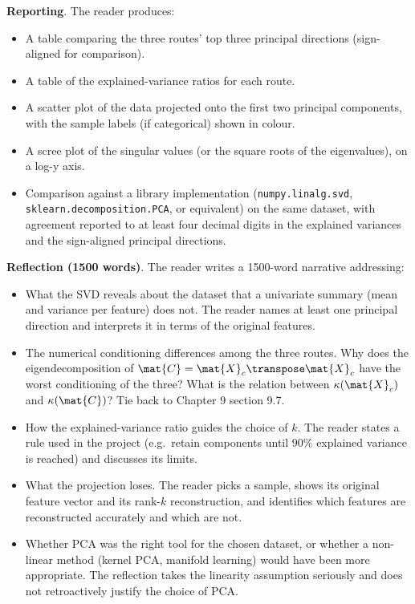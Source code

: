 \begin{project}
\textbf{Reporting}. The reader produces:

\begin{itemize}[leftmargin=*]
  \item A table comparing the three routes' top three principal
    directions (sign-aligned for comparison).
  \item A table of the explained-variance ratios for each route.
  \item A scatter plot of the data projected onto the first two
    principal components, with the sample labels (if categorical)
    shown in colour.
  \item A scree plot of the singular values (or the square roots of
    the eigenvalues), on a log-y axis.
  \item Comparison against a library implementation
    (\texttt{numpy.linalg.svd}, \texttt{sklearn.decomposition.PCA},
    or equivalent) on the same dataset, with agreement reported to
    at least four decimal digits in the explained variances and the
    sign-aligned principal directions.
\end{itemize}

\textbf{Reflection (1500 words)}. The reader writes a 1500-word
narrative addressing:

\begin{itemize}[leftmargin=*]
  \item What the SVD reveals about the dataset that a univariate
    summary (mean and variance per feature) does not. The reader
    names at least one principal direction and interprets it in
    terms of the original features.
  \item The numerical conditioning differences among the three
    routes. Why does the eigendecomposition of $\mat{C} =
    \mat{X}_{c}\transpose \mat{X}_{c}$ have the worst conditioning
    of the three? What is the relation between $\kappa(\mat{X}_{c})$
    and $\kappa(\mat{C})$? Tie back to Chapter 9 section 9.7.
  \item How the explained-variance ratio guides the choice of $k$.
    The reader states a rule used in the project (e.g.\ retain
    components until $90\%$ explained variance is reached) and
    discusses its limits.
  \item What the projection loses. The reader picks a sample, shows
    its original feature vector and its rank-$k$ reconstruction,
    and identifies which features are reconstructed accurately and
    which are not.
  \item Whether PCA was the right tool for the chosen dataset, or
    whether a non-linear method (kernel PCA, manifold learning) would
    have been more appropriate. The reflection takes the linearity
    assumption seriously and does not retroactively justify the
    choice of PCA.
\end{itemize}


\end{project}
